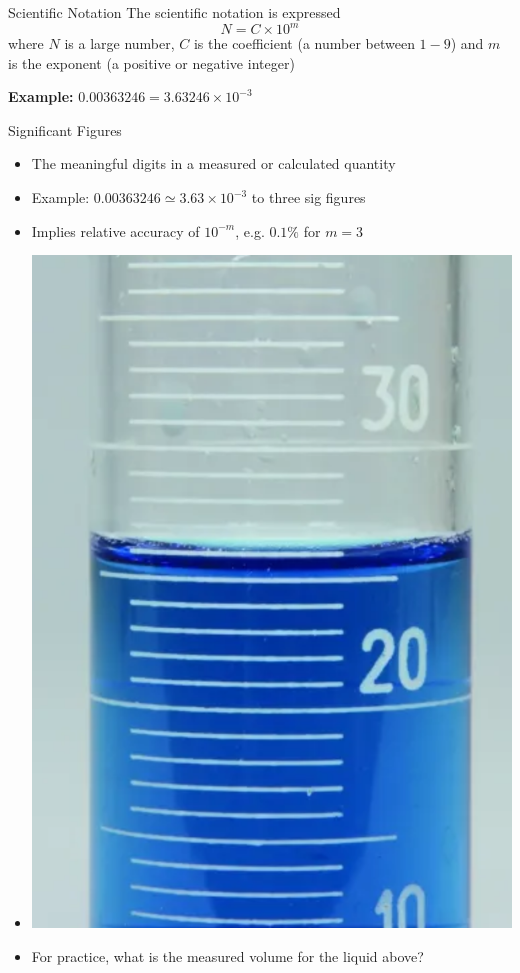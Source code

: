 \documentclass[11pt]{beamer}
\begin{document}
\begin{frame}{Scientific Notation}
  The scientific notation is expressed
  \begin{equation}
    N = C \times 10^m
  \end{equation}
  where $N$ is a large number, $C$ is the coefficient (a number between $1-9$)
  and $m$ is the exponent (a positive or negative integer)

  \textbf{Example:} $0.00363246 = 3.63246 \times 10^{-3}$

\end{frame}

\begin{frame}{Significant Figures}
  \begin{itemize}
  \item The meaningful digits in a measured or calculated
    quantity
  \item Example: $0.00363246 \simeq 3.63 \times 10^{-3}$ to three
    sig figures
  \item Implies relative accuracy of $10^{-m}$, e.g. $0.1\%$ for $m=3$
  \item[] \begin{center}\includegraphics[scale=0.1]{grad}
  \end{center}
  \item For practice, what is the measured volume for the liquid
    above?
  \end{itemize}
\end{frame}
\end{document}
